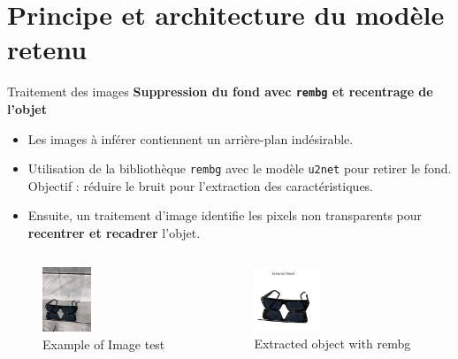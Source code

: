 \documentclass{beamer}
\begin{document}
\section{Principe et architecture du modèle retenu}
\begin{frame}{Traitement des images}
    \footnotesize
    \textbf{Suppression du fond avec \texttt{rembg} et recentrage de l'objet}
    \begin{itemize}
        \item Les images à inférer contiennent un arrière-plan indésirable.
        \item Utilisation de la bibliothèque \texttt{rembg} avec le modèle \texttt{u2net} pour retirer le fond. Objectif : réduire le bruit pour l'extraction des caractéristiques. 
        \item Ensuite, un traitement d’image identifie les pixels non transparents pour \textbf{recentrer et recadrer} l’objet.
    \end{itemize}
    \begin{columns}
        \begin{figure}
            \includegraphics[width=0.4\textwidth]{assets/IMG_6883.jpg}
            \caption{Example of Image test}
        \end{figure}
        \begin{figure}
            \includegraphics[width=0.4\textwidth]{assets/glasses_rembg.png}
            \caption{Extracted object with rembg}
        \end{figure}
    \end{columns}
\end{frame}
\end{document}

